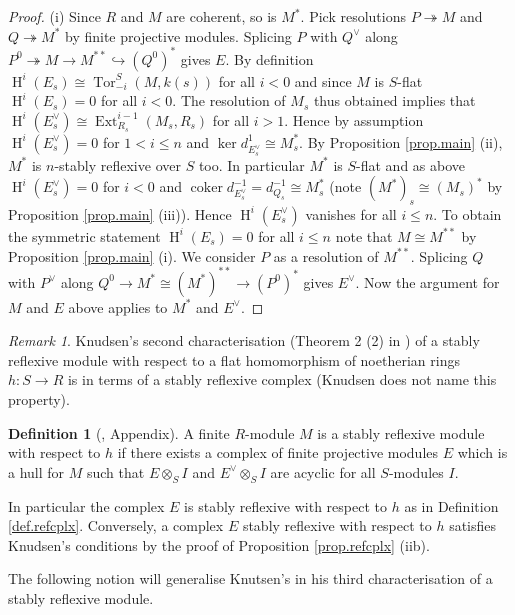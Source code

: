 \documentclass[a4paper,10pt]{amsart}
\theoremstyle{plain}
\theoremstyle{definition}
\newtheorem*{defn*}{Definition}%
\theoremstyle{remark}
\newtheorem{rem}[xx]{Remark}
\numberwithin{equation}{xx}
\DeclareMathOperator{\coker}{coker}
\DeclareMathOperator{\Ext}{Ext}
\DeclareMathOperator{\cH}{H}
\DeclareMathOperator{\Tor}{Tor}
\newcommand{\co}{\colon}
\newcommand{\ra}{\rightarrow}
\newcommand{\thr}{\twoheadrightarrow}
\newcommand{\hra}{\hookrightarrow}
\newcommand{\ot}{{\otimes}}
\renewcommand{\leq}{\leqslant}
\newcommand{\tor}[4]{{\Tor}_{#2}^{#1}({#3},{#4})}
\newcommand{\xt}[4]{{\Ext} _{#2}^{#1}({#3},{#4})}
\begin{document}
\begin{proof}
(i) Since \(R\) and \(M\) are coherent, so is \(M^{*}\). Pick resolutions \(P\thr M\) and \(Q\thr M^{*}\) by finite projective modules. Splicing \(P\) with \(Q^{\vee}\) along \(P^{0}\thr M\ra M^{**}\hra (Q^{0})^{*}\) gives \(E\). By definition \(\cH^{i}(E_{s})\cong\tor{S}{-i}{M}{k(s)}\) for all \(i<0\) and since \(M\) is \(S\)-flat \(\cH^{i}(E_{s})=0\) for all \(i<0\). The resolution of \(M_{s}\) thus obtained implies that \(\cH^{i}(E_{s}^{\vee})\cong\xt{i-1}{R_{s}}{M_{s}}{R_{s}}\) for all \(i>1\). Hence by assumption \(\cH^{i}(E_{s}^{\vee})=0\) for \(1<i\leq n\) and \(\ker d_{E_{s}^{\vee}}^{1}\cong M_{s}^{*}\). By Proposition \ref{prop.main} (ii), \(M^{*}\) is \(n\)-stably reflexive over \(S\) too. In particular \(M^{*}\) is \(S\)-flat and as above \(\cH^{i}(E_{s}^{\vee})=0\) for \(i<0\) and \(\coker d_{E_{s}^{\vee}}^{-1}=d_{Q_{s}}^{-1}\cong M_{s}^{*}\) (note \((M^{*})_{s}\cong (M_{s})^{*}\) by Proposition \ref{prop.main} (iii)). Hence \(\cH^{i}(E_{s}^{\vee})\) vanishes for all \(i\leq n\). To obtain the symmetric statement \(\cH^{i}(E_{s})=0\) for all \(i\leq n\) note that \(M\cong M^{**}\) by Proposition \ref{prop.main} (i). We consider \(P\) as a resolution of \(M^{**}\). Splicing \(Q\) with \(P^{\vee}\) along \(Q^{0}\ra M^{*}\cong (M^{*})^{**}\ra (P^{0})^{*}\) gives \(E^{\vee}\). Now the argument for \(M\) and \(E\) above applies to \(M^{*}\) and \(E^{\vee}\).
\end{proof}
\begin{rem}\label{rem.refcplx2}
Knudsen's second characterisation (Theorem 2 (2) in \cite[Appendix]{knu:83a}) of a stably reflexive module with respect to a flat homomorphism of noetherian rings \(h\co S\ra R\) is in terms of a stably reflexive complex (Knudsen does not name this property).
\begin{defn*}[{\cite{knu:83a}, Appendix}]
A finite \(R\)-module \(M\) is a stably reflexive module with respect to \(h\) if there exists a complex of finite projective modules \(E\) which is a hull for \(M\) such that \(E\ot_{S}I\) and \(E^{\vee}\ot_{S}I\) are acyclic for all \(S\)-modules \(I\).
\end{defn*}
In particular the complex \(E\) is stably reflexive with respect to \(h\) as in Definition \ref{def.refcplx}. Conversely, a complex \(E\) stably reflexive with respect to \(h\) satisfies Knudsen's conditions by the proof of Proposition \ref{prop.refcplx} (iib). 
\end{rem}
The following notion will generalise Knutsen's in his third characterisation of a stably reflexive module.
\end{document}
